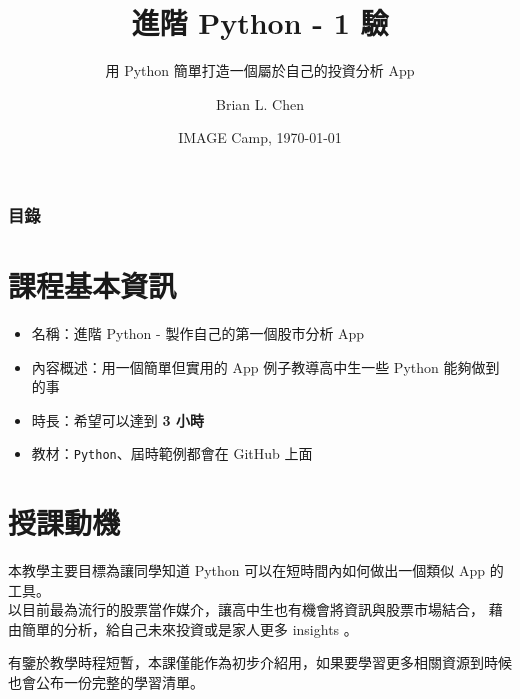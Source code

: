 \documentclass{beamer}
\title{進階 Python - 1 驗}
\subtitle{用 Python 簡單打造一個屬於自己的投資分析 App}
\author{Brian L. Chen}
\institute{
  Department of Information Management\\
  National Taiwan University
}
\date{IMAGE Camp, \today}
\newcommand{\code}[1]{\texttt{\textcolor{pinky}{#1}}}
\begin{document}
\frame{\titlepage}


\begin{frame}
\frametitle{目錄}
\tableofcontents
\end{frame}

\section{課程基本資訊}

\begin{frame}
  \begin{itemize}
    \item 名稱：進階 Python - 製作自己的第一個股市分析 App\footnotemark
    \item 內容概述：用一個簡單但實用的 App 例子教導高中生一些 Python 能夠做到的事
    \item 時長：希望可以達到 \alert{\textbf{3 小時}}
    \item 教材：\code{Python}、屆時範例都會在 GitHub 上面\footnotemark
  \end{itemize}

\end{frame}


\section{授課動機}

\begin{frame}
  本教學主要目標為讓同學知道 Python 可以在短時間內如何做出一個類似 App 的工具。\\
  以目前最為流行的股票當作媒介，讓高中生也有機會將資訊與股票市場結合，
  藉由簡單的分析，給自己未來投資或是家人更多 insights 。
  
  \vspace{5mm} %
  
  有鑒於教學時程短暫，本課僅能作為初步介紹用，如果要學習更多相關資源到時候也會公布一份完整的學習清單。
\end{frame}
\end{document}
